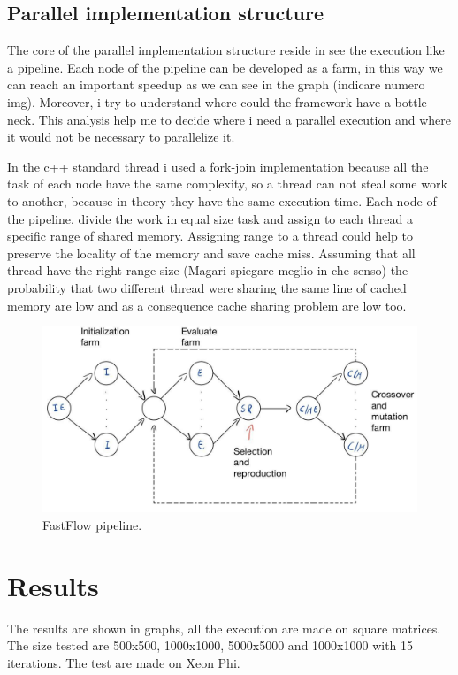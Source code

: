 \documentclass[a4paper,10pt]{article}
\begin{document}
	\subsection{Parallel implementation structure}
	The core of the parallel implementation structure reside in see the execution like a pipeline. Each node of the pipeline can be developed as a farm, in this way we can reach an important speedup as we can see in the graph (indicare numero img). Moreover, i try to understand where could the framework have a bottle neck. This analysis help me to decide where i need a parallel execution and where it would not be necessary to parallelize it. 
	
	In the c++ standard thread i used a fork-join implementation because all the task of each node have the same complexity, so a thread can not steal some work to another, because in theory they have the same execution time. Each node of the pipeline, divide the work in equal size task and assign to each thread a specific range of shared memory. Assigning range to a thread could help to preserve the locality of the memory and save cache miss. Assuming that all thread have the right range size (Magari spiegare meglio in che senso) the probability that two different thread were sharing the same line of cached memory are low and as a consequence cache sharing problem are low too.
	
	\begin{figure}[H]
		\centering

			\includegraphics[width=\linewidth]{img/ff_pipeline.jpg}


		\caption{FastFlow pipeline.}
		\label{ff:pipeline}
	\end{figure}
	

	\section{Results}
	The results are shown in graphs, all the execution are made on square matrices. The size tested are 500x500, 1000x1000, 5000x5000 and 1000x1000 with 15 iterations.
	The test are made on Xeon Phi. 
	
\end{document}
